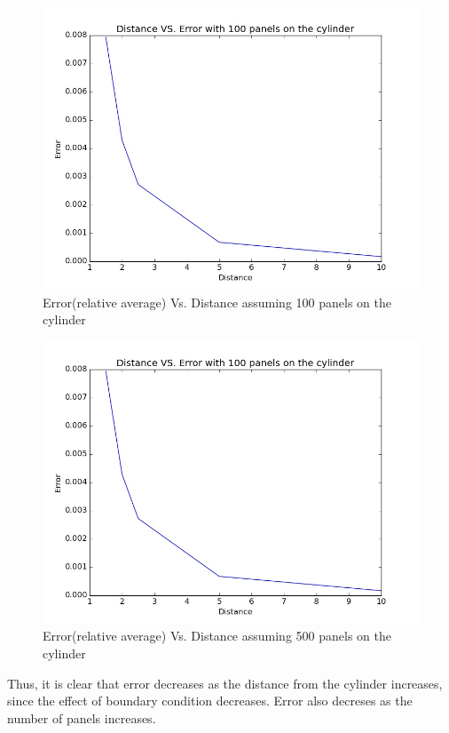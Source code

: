 \documentclass{article}
\begin{document}
\begin{figure}[H]  \label{figure}
\includegraphics[width=12cm]{result3.jpg}
\caption{Error(relative average) Vs. Distance assuming 100 panels on the cylinder}
\label{figure:}
\end{figure}

\begin{figure}[H]  \label{figure}
\includegraphics[width=12cm]{result3.jpg}
\caption{Error(relative average) Vs. Distance assuming 500 panels on the cylinder}
\label{figure:}
\end{figure}

Thus, it is clear that error decreases as the distance from the cylinder increases, since the effect of boundary condition decreases.
Error also decreses as the number of panels increases. 
\end{document}
